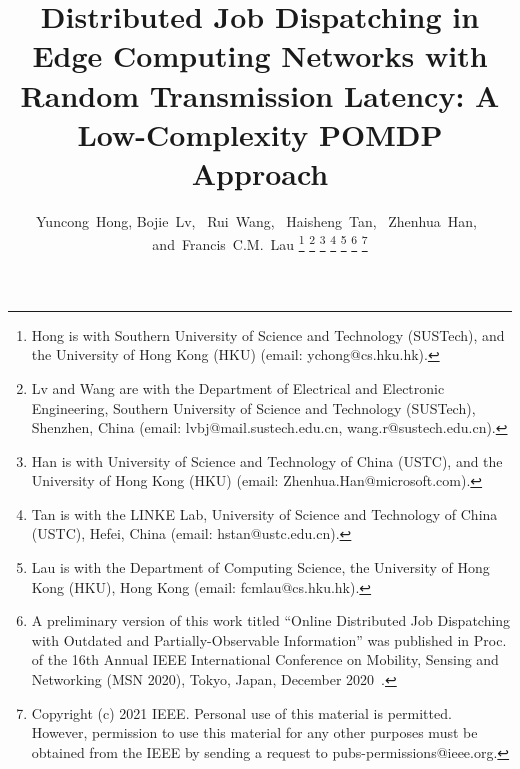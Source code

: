 \documentclass[journal]{IEEEtran} %
\theoremstyle{definition}             %
\theoremstyle{remark}                 %
\theoremstyle{plain}                  %
\newcommand{\hongyc}[1]{{\leavevmode\color{purple}#1}}
\begin{document}
    \title{Distributed Job Dispatching in Edge Computing Networks with Random Transmission Latency: A Low-Complexity POMDP Approach
    }
    
    \author{
        Yuncong~Hong,
        Bojie~Lv,~
        Rui~Wang,~
        Haisheng~Tan,~
        Zhenhua~Han,~
        and~Francis~C.M.~Lau%
        \thanks{
          Hong is with Southern University of Science and Technology (SUSTech), and the University of Hong Kong (HKU) (email: ychong@cs.hku.hk).
        }
        \thanks{
          Lv and Wang are with the Department of Electrical and Electronic Engineering, Southern University of Science and Technology (SUSTech), Shenzhen, China (email: lvbj@mail.sustech.edu.cn, wang.r@sustech.edu.cn).
        }
        \thanks{
          Han is with University of Science and Technology of China (USTC), and the University of Hong Kong (HKU) (email: Zhenhua.Han@microsoft.com).
        }%
        \thanks{
          Tan is with the LINKE Lab,  University of Science and Technology of China (USTC), Hefei, China (email: hstan@ustc.edu.cn).
        }%
        \thanks{
          Lau is with the Department of Computing Science, the University of Hong Kong (HKU), Hong Kong (email: fcmlau@cs.hku.hk).
        }%
        \thanks{
          A preliminary version of this work titled ``Online Distributed Job Dispatching with Outdated and Partially-Observable Information'' was published in Proc. of the 16th Annual IEEE International Conference on Mobility, Sensing and Networking (MSN 2020), Tokyo, Japan, December 2020~\cite{msn2020}.
        }%
        \thanks{\hongyc{
          Copyright (c) 2021 IEEE. Personal use of this material is permitted. However, permission to use this material for any other purposes must be obtained from the IEEE by sending a request to pubs-permissions@ieee.org.
        }}%
    }%
\end{document}
